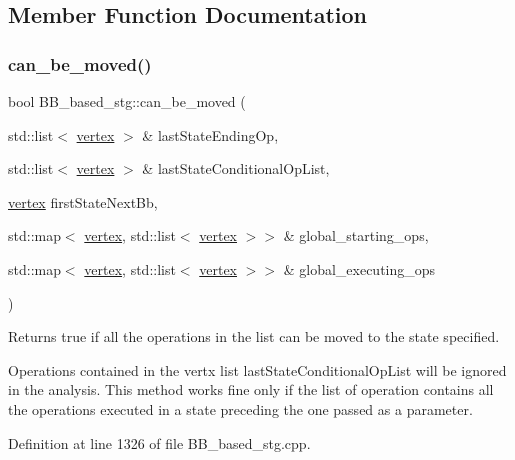 \subsection{Member Function Documentation}
\mbox{\label{classBB__based__stg_afa058ad5484f1872ffe17234aab986b0}} 
\subsubsection{\texorpdfstring{can\+\_\+be\+\_\+moved()}{can\_be\_moved()}}
{\footnotesize\ttfamily bool B\+B\+\_\+based\+\_\+stg\+::can\+\_\+be\+\_\+moved (\begin{DoxyParamCaption}\item[{std\+::list$<$ \hyperlink{graph_8hpp_abefdcf0544e601805af44eca032cca14}{vertex} $>$ \&}]{last\+State\+Ending\+Op,  }\item[{std\+::list$<$ \hyperlink{graph_8hpp_abefdcf0544e601805af44eca032cca14}{vertex} $>$ \&}]{last\+State\+Conditional\+Op\+List,  }\item[{\hyperlink{graph_8hpp_abefdcf0544e601805af44eca032cca14}{vertex}}]{first\+State\+Next\+Bb,  }\item[{std\+::map$<$ \hyperlink{graph_8hpp_abefdcf0544e601805af44eca032cca14}{vertex}, std\+::list$<$ \hyperlink{graph_8hpp_abefdcf0544e601805af44eca032cca14}{vertex} $>$$>$ \&}]{global\+\_\+starting\+\_\+ops,  }\item[{std\+::map$<$ \hyperlink{graph_8hpp_abefdcf0544e601805af44eca032cca14}{vertex}, std\+::list$<$ \hyperlink{graph_8hpp_abefdcf0544e601805af44eca032cca14}{vertex} $>$$>$ \&}]{global\+\_\+executing\+\_\+ops }\end{DoxyParamCaption})\hspace{0.3cm}{\ttfamily [private]}}



Returns true if all the operations in the list can be moved to the state specified. 

Operations contained in the vertx list last\+State\+Conditional\+Op\+List will be ignored in the analysis. This method works fine only if the list of operation contains all the operations executed in a state preceding the one passed as a parameter. 

Definition at line 1326 of file B\+B\+\_\+based\+\_\+stg.\+cpp.



